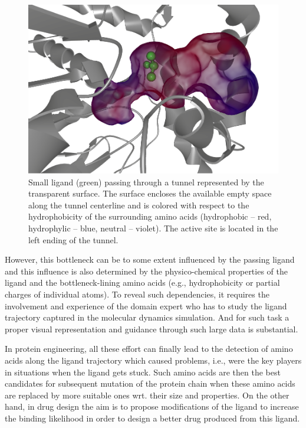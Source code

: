 \documentclass[twocolumn]{bmcart}%
\begin{document}
\begin{figure}[htb]
	\centering
  \includegraphics[width=1\linewidth]{img/tunnel.png}
  \caption{\label{fig:tunnel} Small ligand (green) passing through a tunnel represented by the transparent surface. The surface encloses the available empty space along the tunnel centerline and is colored with respect to the hydrophobicity of the surrounding amino acids (hydrophobic -- red, hydrophylic -- blue, neutral -- violet). The active site is located in the left ending of the tunnel.}
\end{figure}

However, this bottleneck can be to some extent influenced by the passing ligand and this influence is also determined by the physico-chemical properties of the ligand and the bottleneck-lining amino acids (e.g., hydrophobicity or partial charges of individual atoms).
To reveal such dependencies, it requires the involvement and experience of the domain expert who has to study the ligand trajectory captured in the molecular dynamics simulation.
And for such task a proper visual representation and guidance through such large data is substantial.

In protein engineering, all these effort can finally lead to the detection of amino acids along the ligand trajectory which caused problems, i.e., were the key players in situations when the ligand gets stuck.
Such amino acids are then the best candidates for subsequent mutation of the protein chain when these amino acids are replaced by more suitable ones wrt. their size and properties.
On the other hand, in drug design the aim is to propose modifications of the ligand to increase the binding likelihood in order to design a better drug produced from this ligand.
\end{document}
